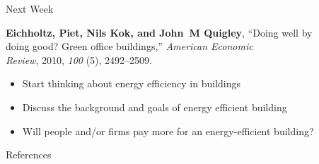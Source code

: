 \documentclass[11pt]{beamer}
\begin{document}
\begin{frame}{Next Week}

{\bf Eichholtz, Piet, Nils Kok, and John~M Quigley}, ``Doing well by\\
\quad doing good? Green office buildings,'' {\it American Economic\\ \quad Review}, 2010, {\it
  100} (5), 2492--2509.

\vfill
\begin{itemize}
	\item Start thinking about energy efficiency in buildings
	\item Discuss the background and goals of energy efficient building
	\item Will people and/or firms pay more for an energy-efficient building?
\end{itemize}

\end{frame}

\begin{frame}{References}
\nocite{*}

\end{frame}
\end{document}
